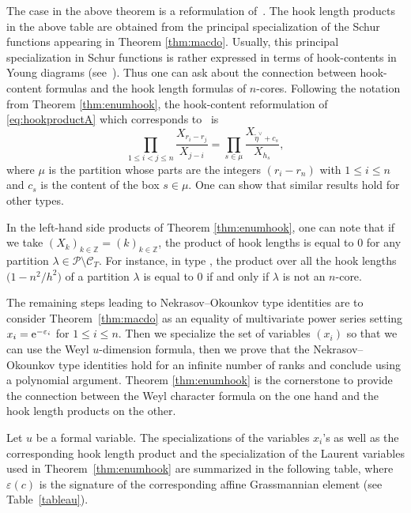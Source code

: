 \documentclass[10pt,a4paper]{amsart}
\numberwithin{equation}{section}
\newcommand{\cC}{\mathcal{C}}
\def\ccp{\mathcal P}
\newcommand{\Z}{\mathbb{Z}}
\begin{document}
\begin{Remark}
The case  in the above theorem is a reformulation of~\cite[Theorem 1]{HD}. The hook length products in the above table are obtained from the principal specialization of the Schur functions appearing in Theorem \ref{thm:macdo}. Usually, this principal specialization in Schur functions is rather expressed in terms of hook-contents in Young diagrams (see~\cite[Theorem $15.3$]{Stanleyhook}). Thus one can ask about the connection between hook-content formulas and the hook length formulas of $n$-cores. Following the notation from Theorem \ref{thm:enumhook}, the hook-content reformulation of \eqref{eq:hookproductA} which corresponds to~\cite[Theorem $17$]{HD} is
\[
\prod_{1\leq i<j\leq n} \frac{X_{r_i-r_j}}{X_{j-i}}=\prod_{s\in\mu} \frac{X_{\tilde{\eta}^{\vee}+c_s}}{X_{h_s}},
\]
where $\mu$ is the partition whose parts are the integers $(r_i-r_n)$ with $1\leq i\leq n$ and $c_s$ is the content of the box $s\in\mu$.
One can show that similar results hold for other types.
\end{Remark}

\begin{Remark}
In the left-hand side products of Theorem \ref{thm:enumhook}, one can note that if we take $(X_k)_{k\in\Z}=(k)_{k\in\Z}$, the product of hook lengths is equal to $0$ for any partition $\lambda\in\ccp\setminus \cC_T$. For instance, in type , the product over all the hook lengths $\bigl(1-n^2/h^2\bigr)$ of a partition $\lambda$ is equal to $0$ if and only if $\lambda$ is not an $n$-core.
\end{Remark}

The remaining steps leading to Nekrasov--Okounkov type identities are to consider Theorem~\ref{thm:macdo} as an equality of multivariate power series setting $x_i={\rm e}^{-\varepsilon_i}$ for $1\leq i\leq n$. Then we specialize the set of variables $(x_i)$ so that we can use the Weyl $u$-dimension formula, then we prove that the Nekrasov--Okounkov type identities hold for an infinite number of ranks and conclude using a polynomial argument. Theorem \ref{thm:enumhook} is the cornerstone to provide the connection between the Weyl character formula on the one hand and the hook length products on the other.

Let $u$ be a formal variable. The specializations of the variables $x_i$'s as well as the corresponding hook length product and the specialization of the Laurent variables used in Theorem~\ref{thm:enumhook} are summarized in the following table, where $\varepsilon(c)$ is the signature of the corresponding affine Grassmannian element (see Table~\ref{tableau}).
\end{document}
